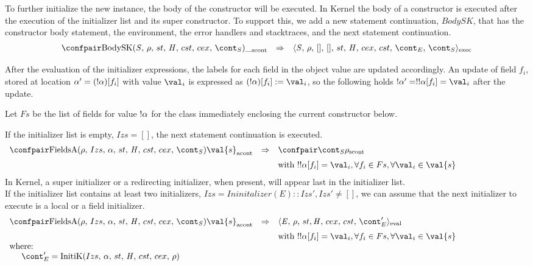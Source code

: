 \documentclass{article}
\begin{document}
\noindent
To further initialize the new instance, the body of the constructor will be executed. In Kernel the body of a constructor is executed after the execution of the initializer list and its super constructor.
\noindent
To support this, we add a new statement continuation, $BodySK$, that has the constructor body statement, the environment, the error handlers and stacktraces, and the next statement continuation.
\[
  \begin{array}{lcl}
	\scontconf{\BodySK{\stmt}{\env}{\scont}}{\_}
	& \Rightarrow &
	\execconf{\stmt}{\env}{[]}{[]}{\handler}{\cex}{\cstrace}{\econt}{\scont}
  \end{array}
\]

\noindent
After the evaluation of the initializer expressions, the labels for each field in the object value are updated accordingly. An update of field $f_i$, stored at location $\alpha' = (!\alpha)[f_i]$ with value $\val_i$ is expressed as $\update{(\deref{\loc})[f_i]}{\val_{i}}$, so the following holds $\deref{\loc'} = \deref{\deref{\loc[f_i]}} = \val_{i}$ after the update.

\noindent
Let $Fs$ be the list of fields for value $!\alpha$ for the class immediately enclosing the current constructor below.

If the initializer list is empty, $Izs = []$, the next statement continuation is executed.
\[
  \begin{array}{lcl@{\hspace{30mm}}}
	\acontconf{\FieldsA{\env}{Izs}{\loc}{\scont}}{\val{s}}
	& \Rightarrow &
	\scontconf{\scont}{\env}\\[2mm]
	&&\textrm{with }\deref{\deref\loc[f_i]} = \val_{i}, \forall f_i \in Fs, \forall \val_i \in \val{s}
  \end{array}
\]
\noindent
In Kernel, a super initializer or a redirecting initializer, when present, will appear last in the initializer list.\\
If the initializer list contains at least two initializers, $Izs = Ininitalizer(E) :: Izs', Izs' \neq []$, we can assume that the next initializer to execute is a local or a field initializer.
\[
  \begin{array}{lcl@{\hspace{30mm}}}
	\acontconf{\FieldsA{\env}{Izs}{\loc}{\scont}}{\val{s}}
	& \Rightarrow &
	\evalconf{\expr}{\env}{st}{cex}{cst}{\econt'}\\[2mm]
	&&\textrm{with }\deref{\deref{\loc[f_i]}} = \val_{i}, \forall f_i \in Fs, \forall \val_i \in \val{s}\\
	\textrm{where:}\\
	\hspace{5mm}\econt' = \InitK{Izs}{\loc}{\env}
  \end{array}
\]
\end{document}
